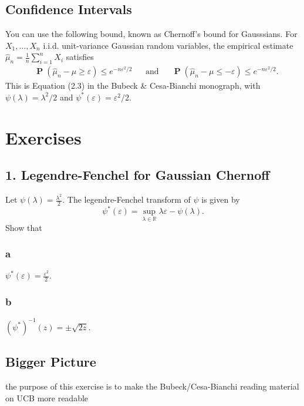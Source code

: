 \documentclass[10pt, a4paper, twoside]{amsart}
\theoremstyle{plain}
\newcommand{\R}{\ensuremath{\mathbb{R}}}
\renewcommand{\P}{\operatorname*{\ensuremath{\mathbf{P}}}} %
\begin{document}
\subsection{Confidence Intervals}
You can use the following bound, known as Chernoff's bound for Gausssians.
For $X_1,\ldots ,X_n$ i.i.d. unit-variance Gaussian random variables, the empirical estimate $\hat{\mu}_n = \frac{1}{n} \sum _{i=1}^n X_i$ satisfies
\begin{align*}
    & \P(\hat{\mu}_n - \mu \geq \varepsilon) \leq e^{-n\varepsilon^2/2} && \mbox{and} && \P(\hat{\mu}_n - \mu \leq -\varepsilon) \leq e^{-n\varepsilon^2/2}.
\end{align*}
This is Equation (2.3) in the Bubeck \& Cesa-Bianchi monograph, with $\psi (\lambda) = \lambda^2/2$ and $\psi^* (\varepsilon) = \varepsilon^2/2$.
\section{Exercises}
\subsection*{1. Legendre-Fenchel for Gaussian Chernoff}
Let $\psi(\lambda) = \frac{\lambda^2}{2}$. The legendre-Fenchel transform of $\psi$ is given by
\begin{equation*}
    \psi^*(\varepsilon) = \sup_{\lambda \in \R}\lambda \varepsilon - \psi(\lambda).
\end{equation*}
Show that
\subsubsection*{a}
$\psi^*(\varepsilon) = \frac{\varepsilon^2}{2}$.
\subsubsection*{b}
$(\psi^*)^{-1}(z) = \pm \sqrt{2z}$.
\subsection*{Bigger Picture} the purpose of this exercise is to make the Bubeck/Cesa-Bianchi reading material on UCB more readable
\end{document}
